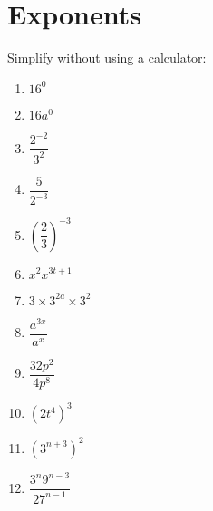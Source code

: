 \chapter{Exponents}
\begin{exercises}{}{
Simplify without using a calculator:
\begin{multicols}{2}
\begin{enumerate}[label=\textbf{\arabic*}., itemsep=4pt]
 \item $16^0$
 \item $16a^0$
 \item $\dfrac{2^{-2}}{3^2}$
 \item $ \dfrac{5}{2^{-3}}$
 \item $ \left(\dfrac{2}{3}\right)^{-3} $
 \item $ x^2 x^{3t+1} $
 \item $ 3 \times 3^{2a} \times 3^2$
 \item $ \dfrac{a^{3x}}{a^x} $
 \item $ \dfrac{32p^2}{4p^8}$
 \item $ (2t^4)^3$
 \item $ (3^{n+3})^2$
 \item $ \dfrac{3^n 9^{n-3}}{27^{n-1}}$
\end{enumerate}
\end{multicols}
}
\end{exercises}


